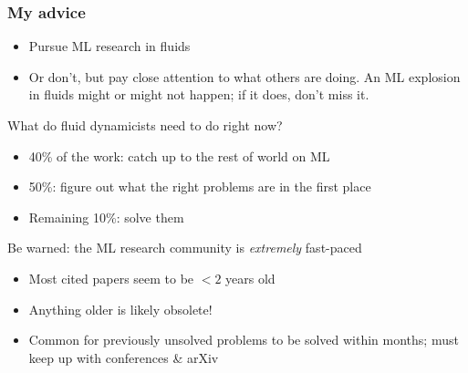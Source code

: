 \begin{frame}
    \frametitle{My advice}

    \begin{itemize}
        \item Pursue ML research in fluids
        \item Or don't, but pay close attention to what others are doing.
        An ML explosion in fluids might or might not happen; if it does, don't miss it.
    \end{itemize}
    \pause

    \begin{block}{What do fluid dynamicists need to do right now?}
        \begin{itemize}
            \item 40\% of the work: catch up to the rest of world on ML
            \item 50\%: figure out \alert{what the right problems are} in the first place
            \item Remaining 10\%: solve them
        \end{itemize}
    \end{block}
    \pause

    Be warned: the ML research community is \emph{extremely} fast-paced
    \begin{itemize}
        \item Most cited papers seem to be $< 2$ years old
        \item Anything older is likely obsolete!
        \item Common for previously unsolved problems to be solved within months; must keep up with conferences \& arXiv
    \end{itemize}
\end{frame}

